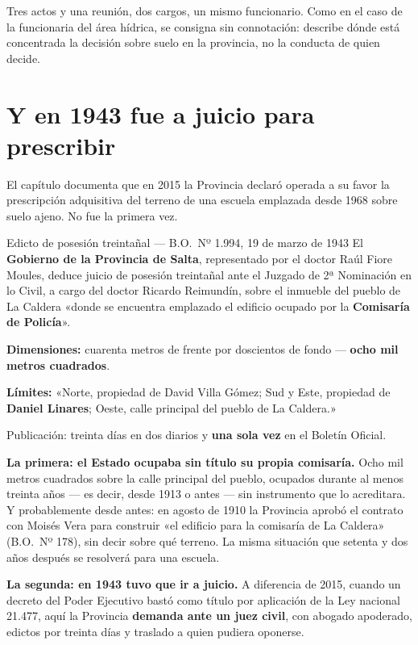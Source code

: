 Tres actos y una reunión, dos cargos, un mismo funcionario. Como en el caso de la funcionaria del área hídrica, se consigna sin connotación: describe dónde está concentrada la decisión sobre suelo en la provincia, no la conducta de quien decide.


\section{Y en 1943 fue a juicio para prescribir}

El capítulo documenta que en 2015 la Provincia declaró operada a su favor la prescripción
adquisitiva del terreno de una escuela emplazada desde 1968 sobre suelo ajeno. No fue la
primera vez.

\begin{ficha}{Edicto de posesión treintañal --- B.O.\ Nº 1.994, 19 de marzo de 1943}
El \textbf{Gobierno de la Provincia de Salta}, representado por el doctor Raúl Fiore Moules,
deduce juicio de posesión treintañal ante el Juzgado de 2ª Nominación en lo Civil, a cargo del
doctor Ricardo Reimundín, sobre el inmueble del pueblo de La Caldera «donde se encuentra
emplazado el edificio ocupado por la \textbf{Comisaría de Policía}».

\textbf{Dimensiones:} cuarenta metros de frente por doscientos de fondo --- \textbf{ocho mil
metros cuadrados}.

\textbf{Límites:} «Norte, propiedad de David Villa Gómez; Sud y Este, propiedad de
\textbf{Daniel Linares}; Oeste, calle principal del pueblo de La Caldera.»

Publicación: treinta días en dos diarios y \textbf{una sola vez} en el Boletín Oficial.
\end{ficha}

\textbf{La primera: el Estado ocupaba sin título su propia comisaría.} Ocho mil metros
cuadrados sobre la calle principal del pueblo, ocupados durante al menos treinta años ---
es decir, desde 1913 o antes --- sin instrumento que lo acreditara. Y probablemente desde
antes: en agosto de 1910 la Provincia aprobó el contrato con Moisés Vera para construir
«el edificio para la comisaría de La Caldera» (B.O.\ Nº 178), sin decir sobre qué terreno. La misma situación que
setenta y dos años después se resolverá para una escuela.

\textbf{La segunda: en 1943 tuvo que ir a juicio.} A diferencia de 2015, cuando un decreto
del Poder Ejecutivo bastó como título por aplicación de la Ley nacional 21.477, aquí la
Provincia \textbf{demanda ante un juez civil}, con abogado apoderado, edictos por treinta
días y traslado a quien pudiera oponerse.

